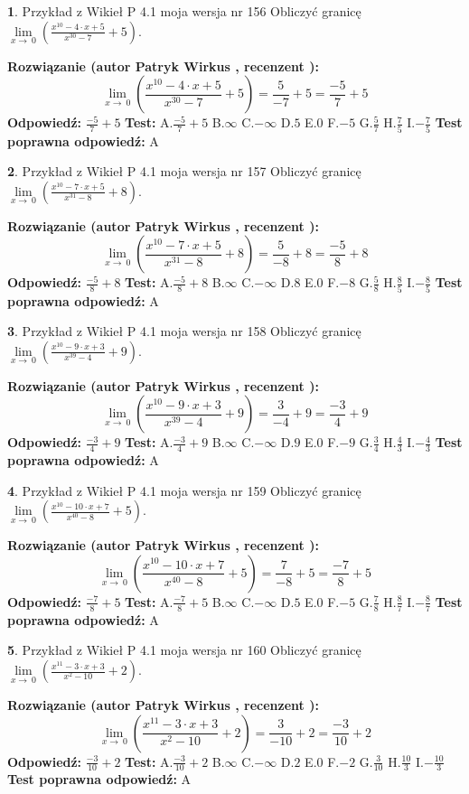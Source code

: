 \documentclass[12pt, a4paper]{article}
\theoremstyle{definition} %
\newtheorem{zad}{}
\newcommand{\zadStart}[1]{\begin{zad}#1\newline}
\newcommand{\zadStop}{\end{zad}}
\newcommand{\rozwStart}[2]{\noindent \textbf{Rozwiązanie (autor #1 , recenzent #2): }\newline}
\newcommand{\rozwStop}{\newline}
\newcommand{\odpStart}{\noindent \textbf{Odpowiedź:}\newline}
\newcommand{\odpStop}{\newline}
\newcommand{\testStart}{\noindent \textbf{Test:}\newline}
\newcommand{\testStop}{\newline}
\newcommand{\kluczStart}{\noindent \textbf{Test poprawna odpowiedź:}\newline}
\newcommand{\kluczStop}{\newline}
\begin{document}
\zadStart{Przykład z Wikieł P 4.1 moja wersja nr 156}
Obliczyć granicę $\lim\limits_{x\to\ 0}(\frac{x^{10}-4 \cdot x +5}{x^{30}-7}+5)$.
\zadStop
\rozwStart{Patryk Wirkus}{}
$$\lim\limits_{x\to\ 0}(\frac{x^{10}-4 \cdot x +5}{x^{30}-7}+5)=\frac{5}{-7}+5=\frac{-5}{7}+5$$
\rozwStop
\odpStart
$\frac{-5}{7}+5$
\odpStop
\testStart
A.$\frac{-5}{7}+5$
B.$\infty$
C.$-\infty$
D.$5$
E.$0$
F.$-5$
G.$\frac{5}{7}$
H.$\frac{7}{5}$
I.$-\frac{7}{5}$
\testStop
\kluczStart
A
\kluczStop



\zadStart{Przykład z Wikieł P 4.1 moja wersja nr 157}
Obliczyć granicę $\lim\limits_{x\to\ 0}(\frac{x^{10}-7 \cdot x +5}{x^{31}-8}+8)$.
\zadStop
\rozwStart{Patryk Wirkus}{}
$$\lim\limits_{x\to\ 0}(\frac{x^{10}-7 \cdot x +5}{x^{31}-8}+8)=\frac{5}{-8}+8=\frac{-5}{8}+8$$
\rozwStop
\odpStart
$\frac{-5}{8}+8$
\odpStop
\testStart
A.$\frac{-5}{8}+8$
B.$\infty$
C.$-\infty$
D.$8$
E.$0$
F.$-8$
G.$\frac{5}{8}$
H.$\frac{8}{5}$
I.$-\frac{8}{5}$
\testStop
\kluczStart
A
\kluczStop



\zadStart{Przykład z Wikieł P 4.1 moja wersja nr 158}
Obliczyć granicę $\lim\limits_{x\to\ 0}(\frac{x^{10}-9 \cdot x +3}{x^{39}-4}+9)$.
\zadStop
\rozwStart{Patryk Wirkus}{}
$$\lim\limits_{x\to\ 0}(\frac{x^{10}-9 \cdot x +3}{x^{39}-4}+9)=\frac{3}{-4}+9=\frac{-3}{4}+9$$
\rozwStop
\odpStart
$\frac{-3}{4}+9$
\odpStop
\testStart
A.$\frac{-3}{4}+9$
B.$\infty$
C.$-\infty$
D.$9$
E.$0$
F.$-9$
G.$\frac{3}{4}$
H.$\frac{4}{3}$
I.$-\frac{4}{3}$
\testStop
\kluczStart
A
\kluczStop



\zadStart{Przykład z Wikieł P 4.1 moja wersja nr 159}
Obliczyć granicę $\lim\limits_{x\to\ 0}(\frac{x^{10}-10 \cdot x +7}{x^{40}-8}+5)$.
\zadStop
\rozwStart{Patryk Wirkus}{}
$$\lim\limits_{x\to\ 0}(\frac{x^{10}-10 \cdot x +7}{x^{40}-8}+5)=\frac{7}{-8}+5=\frac{-7}{8}+5$$
\rozwStop
\odpStart
$\frac{-7}{8}+5$
\odpStop
\testStart
A.$\frac{-7}{8}+5$
B.$\infty$
C.$-\infty$
D.$5$
E.$0$
F.$-5$
G.$\frac{7}{8}$
H.$\frac{8}{7}$
I.$-\frac{8}{7}$
\testStop
\kluczStart
A
\kluczStop



\zadStart{Przykład z Wikieł P 4.1 moja wersja nr 160}
Obliczyć granicę $\lim\limits_{x\to\ 0}(\frac{x^{11}-3 \cdot x +3}{x^{2}-10}+2)$.
\zadStop
\rozwStart{Patryk Wirkus}{}
$$\lim\limits_{x\to\ 0}(\frac{x^{11}-3 \cdot x +3}{x^{2}-10}+2)=\frac{3}{-10}+2=\frac{-3}{10}+2$$
\rozwStop
\odpStart
$\frac{-3}{10}+2$
\odpStop
\testStart
A.$\frac{-3}{10}+2$
B.$\infty$
C.$-\infty$
D.$2$
E.$0$
F.$-2$
G.$\frac{3}{10}$
H.$\frac{10}{3}$
I.$-\frac{10}{3}$
\testStop
\kluczStart
A
\kluczStop
\end{document}
